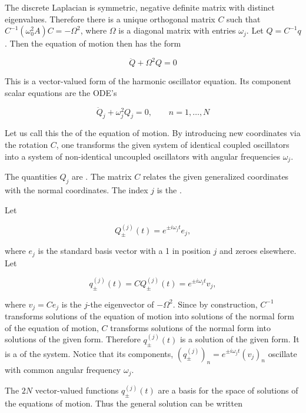 The discrete Laplacian is symmetric, negative definite matrix with distinct eigenvalues. Therefore there is a unique orthogonal matrix $C$ such that $C^{-1}(\omega_0^2A)C = -\Omega^2$, where $\Omega$ is a diagonal matrix with entries $\omega_j$.  Let $Q = C^{-1}q$. Then the equation of motion then has the form

\begin{equation}
\ddot Q + \Omega^2 Q = 0
\end{equation}

This is a vector-valued form of the harmonic oscillator equation.  Its component scalar equations are the ODE's

\begin{equation}
\ddot Q_j + \omega_j^2 Q_j = 0, \qquad n = 1, \ldots, N
\end{equation}

Let us call this the  of the equation of motion.
By introducing new coordinates via the rotation $C$, one transforms the given system of identical coupled oscillators into a system of non-identical uncoupled oscillators with angular frequencies $\omega_j$.

The quantities $Q_j$ are .  The matrix $C$ relates the given generalized coordinates with the normal coordinates.  The index $j$ is the .

Let

\begin{equation}
Q^{(j)}_\pm(t) = e^{\pm i \omega_j t} e_j,
\end{equation}

where $e_j$ is the standard basis vector with a 1 in position $j$ and zeroes elsewhere.  Let

\begin{equation}
q^{(j)}_\pm(t) =  CQ^{(j)}_\pm(t) =  e^{\pm i\omega_j t} v_j,
\end{equation}

where $v_j = Ce_j$ is the $j$-the eigenvector of $-\Omega^2$.
Since by construction, $C^{-1}$ transforms solutions of the equation of motion into solutions of the normal form of the  equation of motion, $C$ transforms solutions of the normal form into solutions of the given form.  Therefore $q^{(j)}_\pm(t)$ is a solution of the given form.  It is a  of the system.  Notice that its components,
$(q_\pm^{(j)})_n = e^{\pm i\omega_j t} (v_j)_n$ oscillate with common angular frequency $\omega_j$.

The $2N$ vector-valued functions $q^{(j)}_\pm(t)$ are a basis for the space of solutions of the equations of motion.  Thus the general solution can be written

